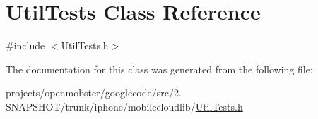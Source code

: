 \hypertarget{interface_util_tests}{
\section{\-Util\-Tests \-Class \-Reference}
\label{interface_util_tests}
}


{\ttfamily \#include $<$\-Util\-Tests.\-h$>$}



\-The documentation for this class was generated from the following file\-:\begin{DoxyCompactItemize}
\item 
projects/openmobster/googlecode/src/2.-\/\-S\-N\-A\-P\-S\-H\-O\-T/trunk/iphone/mobilecloudlib/\hyperlink{_util_tests_8h}{\-Util\-Tests.\-h}\end{DoxyCompactItemize}
